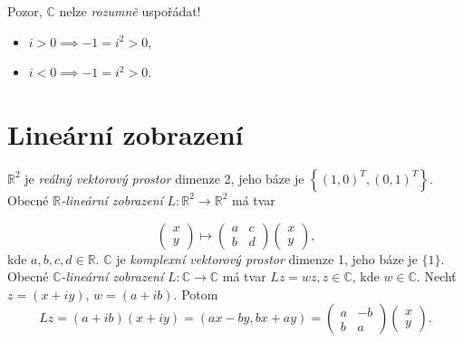 
Pozor, $\mathbb{C}$ nelze \emph{rozumně} uspořádat!
\begin{itemize}
    \item $i>0\implies -1=i^2>0$,
    \item $i<0\implies -1=i^2>0$.
\end{itemize}


\section{Lineární zobrazení}
\begin{definition}
$\mathbb{R}^2$ je \emph{reálný vektorový prostor} dimenze 2, jeho báze je $\left\{(1,0)^T, (0,1)^T\right\}$. Obecné $\mathbb{R}$\emph{-lineární zobrazení} $L:\mathbb{R}^2\to\mathbb{R}^2$ má tvar 

\begin{equation}\label{eq:rLinearMap}
\begin{pmatrix}
x \\ y
\end{pmatrix}
\longmapsto
\begin{pmatrix}
a & c\\
b & d
\end{pmatrix}
\begin{pmatrix}
x \\ y
\end{pmatrix}
\text{,}
\end{equation}
kde $a,b,c,d\in\mathbb{R}$.
$\mathbb{C}$ je \emph{komplexní vektorový prostor} dimenze 1, jeho báze je $\{1\}$. Obecné $\mathbb{C}$\emph{-lineární zobrazení} $L:\mathbb{C}\to\mathbb{C}$ má tvar $Lz = wz, z\in\mathbb{C}$, kde $w\in\mathbb{C}$. Nechť $z = (x+iy)$, $ w=(a+ib)$. 
Potom $$Lz=(a+ib)(x+iy)= (ax-by, bx+ay) = 
\begin{pmatrix}
a & -b\\
b & a
\end{pmatrix}
\begin{pmatrix}
x \\ y
\end{pmatrix}\text{.}$$
\end{definition}


